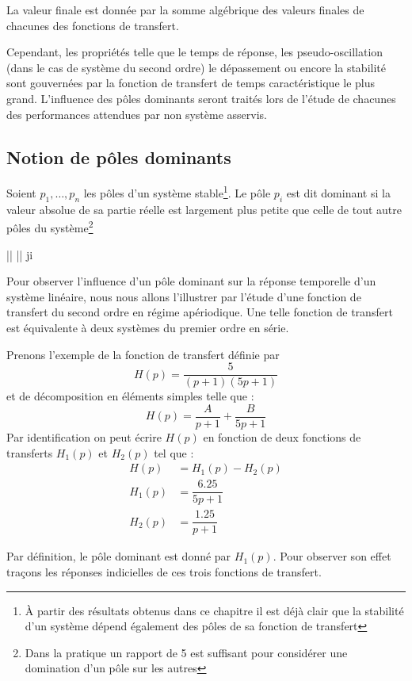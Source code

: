La valeur finale est donnée par la somme algébrique des valeurs finales de chacunes
des fonctions de transfert.

Cependant, les propriétés telle que le temps de réponse, 
les pseudo-oscillation (dans le cas de système du second ordre) 
le dépassement ou encore la stabilité sont gouvernées 
par la fonction de transfert de temps caractéristique le plus grand. 
L'influence des pôles dominants seront traités lors de l'étude 
de chacunes des performances attendues par non système asservis.

\subsection{Notion de pôles dominants}

Soient $p_1,\ldots,p_n$ les pôles d'un système stable\footnote{À partir 
des résultats obtenus dans ce chapitre il est déjà clair que la stabilité
d'un système dépend également des pôles de sa fonction de transfert}.
Le pôle $p_i$ est dit dominant si la valeur absolue
de sa partie réelle est largement plus petite que celle de tout autre pôles 
du système\footnote{Dans la pratique un rapport de 5 est 
suffisant pour considérer une domination d'un pôle sur les autres}
\begin{bequation}
	\big|\big| \ll \big|\big|\;\; \forall j\neq i
\end{bequation}

Pour observer l'influence d'un pôle dominant sur 
la réponse temporelle d'un système linéaire, nous
nous allons l'illustrer par l'étude d'une fonction 
de transfert du second ordre en régime apériodique.
Une telle fonction de transfert est équivalente à deux
systèmes du premier ordre en série.

Prenons l'exemple de la fonction de transfert définie par  
$$
H(p)=\dfrac{5}{(p+1)(5p+1)}
$$
et de décomposition en éléments simples telle que :
$$
H(p)=\dfrac{A}{p+1}+\dfrac{B}{5p+1}
$$
Par identification on peut écrire $H(p)$ en fonction de
deux fonctions de transferts $H_1(p)$ et $H_2(p)$ tel que :
\begin{align*}
	H(p)&=H_1(p)-H_2(p)\\
	H_1(p)&=\dfrac{6.25}{5p+1}\\
	H_2(p)&=\dfrac{1.25}{p+1}
\end{align*}

Par définition, le pôle dominant est donné par $H_1(p)$.
Pour observer son effet traçons les réponses indicielles 
de ces trois fonctions de transfert.


